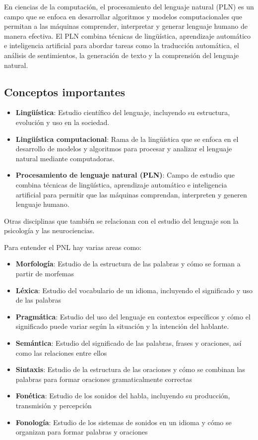 \documentclass[11pt,letterpaper]{article}
\begin{document}
En ciencias de la computación, el procesamiento del lenguaje natural (PLN) es un campo que se enfoca en desarrollar algoritmos y modelos 
computacionales que permitan a las máquinas comprender, interpretar y generar lenguaje humano de manera efectiva. 
El PLN combina técnicas de lingüística, aprendizaje automático e inteligencia artificial para abordar tareas como la traducción automática, 
el análisis de sentimientos, la generación de texto y la comprensión del lenguaje natural.

\vspace{2em}

\subsection*{Conceptos importantes}

\begin{itemize}
    \item \textbf{Lingüística}: Estudio científico del lenguaje, incluyendo su estructura, evolución y uso en la sociedad.
    \item \textbf{Lingüística computacional}: Rama de la lingüística que se enfoca en el desarrollo de modelos y algoritmos para procesar y analizar el lenguaje natural mediante computadoras.
    \item \textbf{Procesamiento de lenguaje natural (PLN)}: Campo de estudio que combina técnicas de lingüística, aprendizaje automático e inteligencia artificial para permitir que las máquinas comprendan, interpreten y generen lenguaje humano.
\end{itemize}

Otras disciplinas que también se relacionan con el estudio del lenguaje son la psicología y las neurociencias.

Para entender el PNL hay varias areas como:
\begin{itemize}
    \item \textbf{Morfología}: Estudio de la estructura de las palabras y cómo se forman a partir de morfemas
    \item \textbf{Léxica}: Estudio del vocabulario de un idioma, incluyendo el significado y uso de las palabras
    \item \textbf{Pragmática}: Estudio del uso del lenguaje en contextos específicos y cómo el significado puede variar según la situación y la intención del hablante.
    \item \textbf{Semántica}: Estudio del significado de las palabras, frases y oraciones, así como las relaciones entre ellos
    \item \textbf{Sintaxis}: Estudio de la estructura de las oraciones y cómo se combinan las palabras para formar oraciones gramaticalmente correctas
    \item \textbf{Fonética}: Estudio de los sonidos del habla, incluyendo su producción, transmisión y percepción
    \item \textbf{Fonología}: Estudio de los sistemas de sonidos en un idioma y cómo se organizan para formar palabras y oraciones
\end{itemize}
\end{document}
